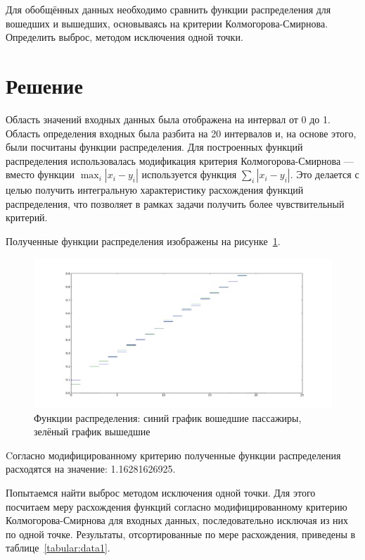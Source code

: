 \documentclass[12pt,a4paper,oneside]{extarticle}
\begin{document}
    Для обобщённых данных необходимо сравнить функции распределения для вошедших и вышедших, основываясь на критерии Колмогорова-Смирнова. Определить выброс, методом исключения одной точки.

\section{Решение}
    Область значений входных данных была отображена на интервал от 0 до 1. Область определения входных была разбита на 20 интервалов и, на основе этого, были посчитаны функции распределения.
    Для построенных функций распределения использовалась модификация критерия Колмогорова-Смирнова --- вместо функции $\max_i|x_i-y_i|$ используется функция $\sum_{i}|x_i-y_i|$. Это делается с целью получить интегральную характеристику расхождения функций распределения, что позволяет в рамках задачи получить более чувствительный критерий.

    Полученные функции распределения изображены на рисунке~\ref{pic:case1}.
    \begin{figure}[ht!]
    \center
        \includegraphics[scale=0.45]{figure_1.png}
        \caption{Функции распределения: синий график вошедшие пассажиры, зелёный график вышедшие}
        \label{pic:case1}
    \end{figure}
    Cогласно модифицированному критерию полученные функции распределения расходятся на значение: 1.16281626925.

    Попытаемся найти выброс методом исключения одной точки. Для этого посчитаем меру расхождения функций согласно модифицированному критерию Колмогорова-Смирнова для входных данных, последовательно исключая из них по одной точке. Результаты, отсортированные по мере расхождения, приведены в таблице~\ref{tabular:data1}.
\end{document}
